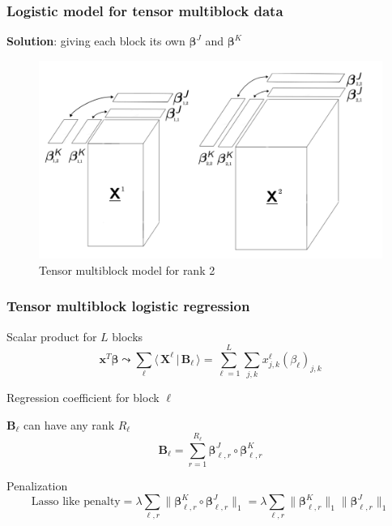 \documentclass{beamer}
\begin{document}

\begin{frame}
    \frametitle{Logistic model for tensor multiblock data}
    \vspace{10 pt}
    \textbf{Solution}: giving each block its own $\bm{\beta}^J$ and $\bm{\beta}^K$\\[15 pt]
    \begin{figure}
        \centering
        \includegraphics[scale = 0.26]{images/beta_blocks.png}
        \caption{Tensor multiblock model for rank 2}
    \end{figure}
\end{frame}

\begin{frame}
    \frametitle{Tensor multiblock logistic regression}
    \begin{block}{Scalar product for $L$ blocks}
        $$\mathbf{x}^T\bm{\beta} \leadsto \sum\limits_{\ell}\langle \,\mathbf{X}^\ell \, |\, \mathbf{B}_\ell \,\rangle  = \sum\limits_{\ell = 1}^L \sum\limits_{j,k} x_{j,k}^\ell(\beta_\ell)_{j,k}$$
       \end{block}

    \begin{block}{Regression coefficient for block $\ell$}
    
    $\mathbf{B}_\ell$ can have any rank $R_\ell$
    $$\mathbf{B}_\ell = \sum\limits_{r = 1}^{R_\ell} \bm{\beta}_{\ell,r}^J \circ \bm{\beta}_{\ell,r}^K $$
    \end{block}
    \begin{block}{Penalization}
        $$\text{Lasso like penalty} = \lambda \sum\limits_{\ell,r}\lVert \bm{\beta}_{\ell,r}^K \circ \bm{\beta}_{\ell,r}^J \rVert_1 = \lambda \sum\limits_{\ell,r}  \lVert \bm{\beta}_{\ell,r}^K \rVert_1 \lVert \bm{\beta}_{\ell,r}^J \rVert_1 $$
    \end{block}
\end{frame}
\end{document}
